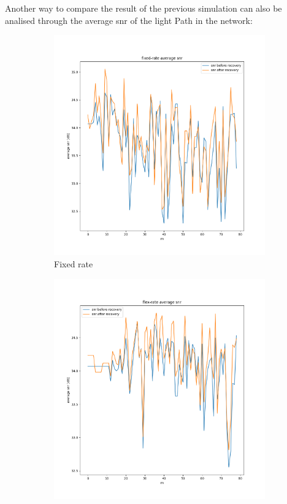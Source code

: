 \documentclass{beamer}
\begin{document}
	\begin{frame}
		Another way to compare the result of the previous simulation can also be analised through the average snr of the light Path in the network:
		\begin{figure}[h]
			\centering
			\begin{subfigure}{0.31\textwidth}
				\includegraphics[width=\linewidth]{Pictures/fixed rate average snr.png}
				\caption{Fixed rate}
			\end{subfigure}
			\hspace*{\fill}
			\begin{subfigure}{0.31\textwidth}
				\includegraphics[width=\linewidth]{Pictures/flex rate average snr.png}

\end{subfigure}
\end{figure}
\end{frame}
\end{document}
